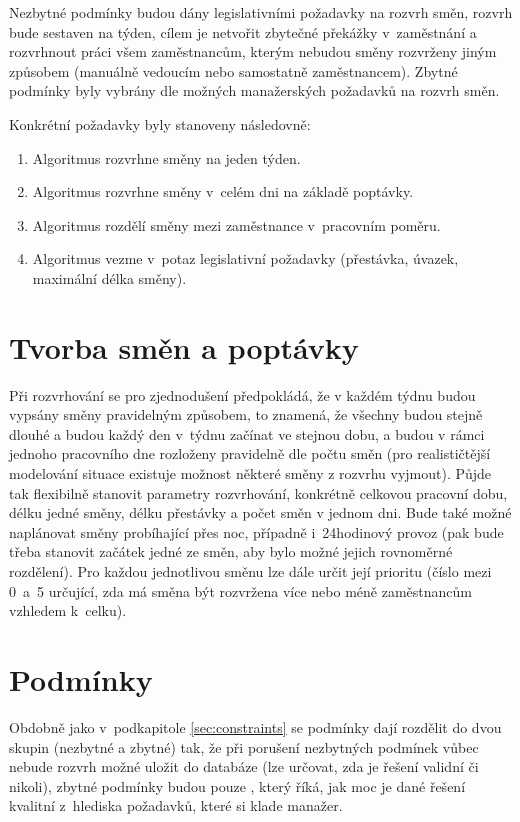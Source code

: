 \documentclass[twoside]{ctuthesis}
\begin{document}
Nezbytné podmínky budou dány legislativními požadavky na rozvrh směn, rozvrh bude sestaven na týden, cílem je netvořit zbytečné překážky v~zaměstnání a rozvrhnout práci všem zaměstnancům, kterým nebudou směny rozvrženy jiným způsobem (manuálně vedoucím nebo samostatně zaměstnancem). Zbytné podmínky byly vybrány dle možných manažerských požadavků na rozvrh směn.

Konkrétní požadavky byly stanoveny následovně:
\begin{enumerate}
	\item Algoritmus rozvrhne směny na jeden týden.
	\item Algoritmus rozvrhne směny v~celém dni na základě poptávky.
	\item Algoritmus rozdělí směny mezi zaměstnance v~pracovním poměru.
	\item Algoritmus vezme v~potaz legislativní požadavky (přestávka, úvazek, maximální délka směny).
\end{enumerate}

\section{Tvorba směn a poptávky}\label{sub:demand}
Při rozvrhování se pro zjednodušení předpokládá, že v každém týdnu budou vypsány směny pravidelným způsobem, to znamená, že všechny budou stejně dlouhé a budou každý den v~týdnu začínat ve stejnou dobu, a budou v rámci jednoho pracovního dne rozloženy pravidelně dle počtu směn (pro realističtější modelování situace existuje možnost některé směny z rozvrhu vyjmout). Půjde tak flexibilně stanovit parametry rozvrhování, konkrétně celkovou pracovní dobu, délku jedné směny, délku přestávky a počet směn v jednom dni. Bude také možné naplánovat směny probíhající přes noc, případně i~24hodinový provoz (pak bude třeba stanovit začátek jedné ze směn, aby bylo možné jejich rovnoměrné rozdělení). Pro každou jednotlivou směnu lze dále určit její prioritu (číslo mezi 0~a~5 určující, zda má směna být rozvržena více nebo méně zaměstnancům vzhledem k~celku).

\section{Podmínky}
Obdobně jako v~podkapitole \ref{sec:constraints} se podmínky dají rozdělit do dvou skupin (nezbytné a zbytné) tak, že při porušení nezbytných podmínek vůbec nebude rozvrh možné uložit do databáze (lze určovat, zda je řešení validní či nikoli), zbytné podmínky budou pouze , který říká, jak moc je dané řešení kvalitní z~hlediska požadavků, které si klade manažer.
\end{document}
